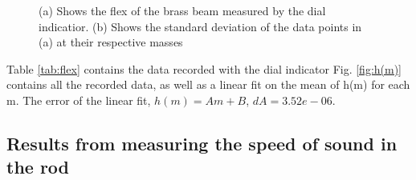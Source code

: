 \documentclass[11pt,a4paper]{article}
\begin{document}
   
    \begin{figure}[H]
      \centering
      \center
      \caption{(a) Shows the flex of the brass beam measured by the dial indicatior. (b) Shows the standard deviation of the data points in (a) at their respective masses}
      \label{fig:exp_1}
    \end{figure}

  Table \ref{tab:flex} contains the data recorded with the dial indicator
  \newline
  \newline
  Fig. \ref{fig:h(m)} contains all the recorded data, as well as a linear fit on the mean of h(m) for each m. The error of the linear fit, $h(m) = Am + B$, $dA = 3.52e-06$.

  \subsection{Results from measuring the speed of sound in the rod}
\end{document}
